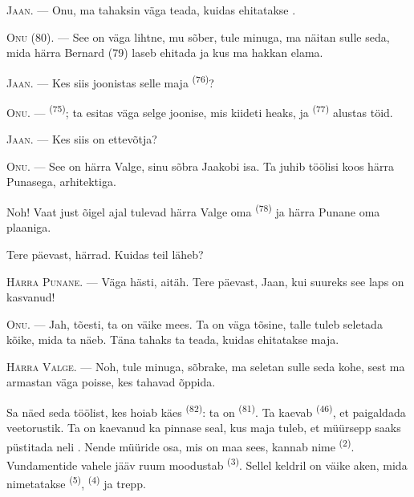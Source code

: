 \VUsaut{6.0mm}
\VUsaut{1.4mm}
\VUsaut{2.2mm}

\VUsaut{3.0mm}

\textsc{Jaan}. --- Onu, ma tahaksin väga teada, kuidas ehitatakse .

\textsc{Onu} (80). --- See on väga lihtne, mu sõber, tule minuga, ma näitan sulle
seda, mida härra Bernard (79) laseb ehitada ja kus ma hakkan elama.

\textsc{Jaan}. --- Kes siis joonistas selle maja  \textsuperscript{(76)}?

\textsc{Onu}. ---  \textsuperscript{(75)}; ta esitas väga selge
joonise, mis kiideti heaks, ja  \textsuperscript{(77)} alustas töid.

\textsc{Jaan}. --- Kes siis on ettevõtja?

\textsc{Onu}. --- See on härra Valge, sinu sõbra Jaakobi isa. Ta juhib töölisi koos
härra Punasega, arhitektiga.

Noh! Vaat just õigel ajal tulevad härra Valge oma 
\textsuperscript{(78)} ja härra Punane oma plaaniga.

Tere päevast, härrad. Kuidas teil läheb?

\textsc{Härra Punane}. --- Väga hästi, aitäh. Tere päevast, Jaan, kui suureks see laps
on kasvanud!

\textsc{Onu}. --- Jah, tõesti, ta on väike mees. Ta on väga tõsine, talle tuleb
seletada kõike, mida ta näeb. Täna tahaks ta teada, kuidas ehitatakse maja.

\VUsaut{3.0mm}

\textsc{Härra Valge}. --- Noh, tule minuga, sõbrake, ma seletan sulle seda kohe, sest
ma armastan väga poisse, kes tahavad õppida.

Sa näed seda töölist, kes hoiab käes  \textsuperscript{(82)}: ta on
 \textsuperscript{(81)}. Ta kaevab  \textsuperscript{(46)},
et paigaldada veetorustik. Ta on kaevanud ka pinnase seal, kus maja tuleb, et müürsepp
saaks püstitada neli . Nende müüride osa, mis on maa sees, kannab nime
 \textsuperscript{(2)}. Vundamentide vahele jääv ruum moodustab
 \textsuperscript{(3)}. Sellel keldril on väike aken, mida nimetatakse
 \textsuperscript{(5)},  \textsuperscript{(4)} ja trepp.

